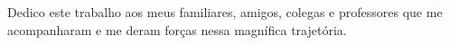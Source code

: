 \begin{dedicatoria}
   \vspace*{\fill}

{%
	\noindent\hspace{.5\textwidth}
	{\begin{minipage}{.5\textwidth}
			\begin{flushleft}
				Dedico este trabalho aos meus familiares, amigos, colegas e professores que me acompanharam e me deram forças nessa magnífica trajetória.
			\end{flushleft}
	\end{minipage}}%
\vspace*{3cm}
}%

\end{dedicatoria}
